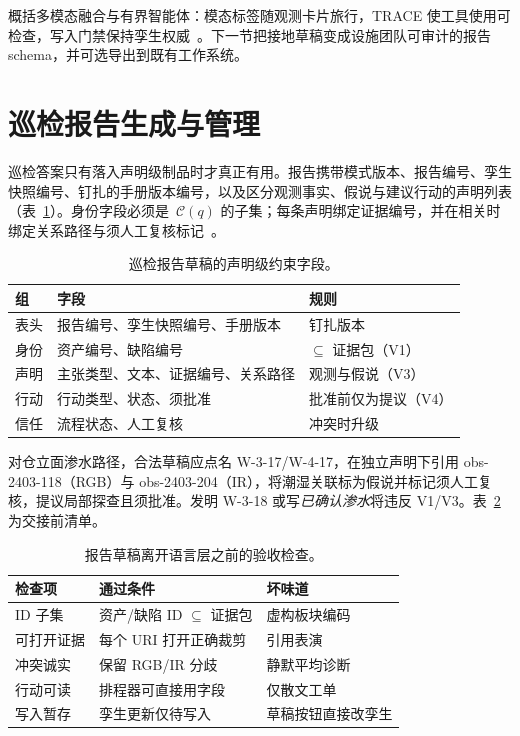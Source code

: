 概括多模态融合与有界智能体：模态标签随观测卡片旅行，TRACE 使工具使用可检查，写入门禁保持孪生权威~\cite{zhao2026physical,yao2023react,luo2025llmdtrobot,lu2026highwaymas}。下一节把接地草稿变成设施团队可审计的报告 schema，并可选导出到既有工作系统。

\section{巡检报告生成与管理}
\label{sec:ch8-reports}

巡检答案只有落入声明级制品时才真正有用。报告携带模式版本、报告编号、孪生快照编号、钉扎的手册版本编号，以及区分观测事实、假说与建议行动的声明列表（表~\ref{tab:ch8-schema}）。身份字段必须是~$\mathcal{C}(q)$ 的子集；每条声明绑定证据编号，并在相关时绑定关系路径与须人工复核标记~\cite{zheng2023bimassistant,joffe2025buildingcodes,ji2023}。

\begin{table}[htbp]
\centering
\caption{巡检报告草稿的声明级约束字段。}
\label{tab:ch8-schema}
\begin{tabular}{llp{5.4cm}}
\toprule
组 & 字段 & 规则 \\
\midrule
表头 & 报告编号、孪生快照编号、手册版本 & 钉扎版本 \\
身份 & 资产编号、缺陷编号 & $\subseteq$ 证据包（V1） \\
声明 & 主张类型、文本、证据编号、关系路径 & 观测与假说（V3） \\
行动 & 行动类型、状态、须批准 & 批准前仅为提议（V4） \\
信任 & 流程状态、人工复核 & 冲突时升级 \\
\bottomrule
\end{tabular}
\end{table}

对仓立面渗水路径，合法草稿应点名 W-3-17/W-4-17，在独立声明下引用 obs-2403-118（RGB）与 obs-2403-204（IR），将潮湿关联标为假说并标记须人工复核，提议局部探查且须批准。发明 W-3-18 或写\emph{已确认渗水}将违反 V1/V3。表~\ref{tab:ch8-report-accept} 为交接前清单。

\begin{table}[htbp]
\centering
\caption{报告草稿离开语言层之前的验收检查。}
\label{tab:ch8-report-accept}
\begin{tabular}{llp{4.6cm}}
\toprule
检查项 & 通过条件 & 坏味道 \\
\midrule
ID 子集 & 资产/缺陷 ID $\subseteq$ 证据包 & 虚构板块编码 \\
可打开证据 & 每个 URI 打开正确裁剪 & 引用表演 \\
冲突诚实 & 保留 RGB/IR 分歧 & 静默平均诊断 \\
行动可读 & 排程器可直接用字段 & 仅散文工单 \\
写入暂存 & 孪生更新仅待写入 & 草稿按钮直接改孪生 \\
\bottomrule
\end{tabular}
\end{table}

